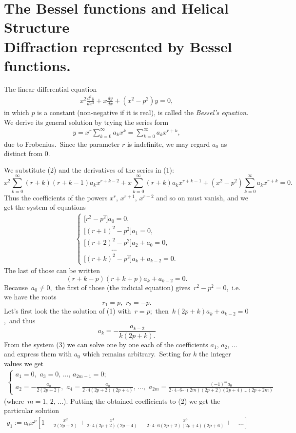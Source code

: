 \documentclass[12pt]{article}
\theoremstyle{plain}
\theoremstyle{definition}
\numberwithin{equation}{section}
\begin{document}
 

\section{The Bessel functions and Helical Structure \\
Diffraction represented by Bessel functions.}

The linear differential equation 
\begin{align}
  x^2\frac{d^2y}{dx^2}+x\frac{dy}{dx}+(x^2-p^2)y = 0,
\end{align}
in which $p$ is a constant (non-negative if it is real), is called the {\em Bessel's equation}.\, We derive its general solution by trying the series form
\begin{align}
               y = x^r\sum_{k=0}^\infty a_kx^k = \sum_{k=0}^\infty a_kx^{r+k},
\end{align}
due to Frobenius.\, Since the parameter $r$ is indefinite, we may regard $a_0$ as distinct from 0.

We substitute (2) and the derivatives of the series in (1):
$$
x^2\sum_{k=0}^\infty(r+k)(r+k-1)a_kx^{r+k-2}+
  x\sum_{k=0}^\infty(r+k)a_kx^{r+k-1}+
(x^2-p^2)\sum_{k=0}^\infty a_kx^{r+k} = 0.
$$
Thus the coefficients of the powers $x^r$, $x^{r+1}$, $x^{r+2}$ and so on must vanish, and we get the system of equations
\begin{align}
\begin{cases}
{[}r^2-p^2{]}a_0 = 0,\\
{[}(r+1)^2-p^2{]}a_1 = 0,\\
{[}(r+2)^2-p^2{]}a_2+a_0 = 0,\\
\qquad \qquad \ldots\\
{[}(r+k)^2-p^2{]}a_k+a_{k-2} = 0.
\end{cases}
\end{align}
The last of those can be written
$$(r+k-p)(r+k+p)a_k+a_{k-2} = 0.$$
Because\, $a_0 \neq 0$,\, the first of those (the indicial equation) gives\, $r^2-p^2 = 0$,\, i.e. we have the roots
$$r_1 =  p,\,\, r_2 = -p.$$
Let's first look the the solution of (1) with\, $r = p$;\, then\, $k(2p+k)a_k+a_{k-2} = 0$,\, and thus\,
$$a_k = -\frac{a_{k-2}}{k(2p+k).}$$
From the system (3) we can solve one by one each of the coefficients $a_1$, $a_2$, $\ldots$\, and express them with $a_0$ which remains arbitrary.\, Setting for $k$ the integer values we get
\begin{align}
\begin{cases}
a_1 = 0,\,\,a_3 = 0,\,\ldots,\, a_{2m-1} = 0;\\
a_2 = -\frac{a_0}{2(2p+2)},\,\,a_4 = \frac{a_0}{2\cdot4(2p+2)(2p+4)},\,\ldots,\,\,
a_{2m} = \frac{(-1)^ma_0}{2\cdot4\cdot6\cdots(2m)(2p+2)(2p+4)\ldots(2p+2m)}
\end{cases}
\end{align}
(where\, $m = 1,\,2,\,\ldots$).
Putting the obtained coefficients to (2) we get the particular solution 
\begin{align}
 y_1 := a_0x^p \left[1\!-\!\frac{x^2}{2(2p\!+\!2)}\!
+\!\frac{x^4}{2\!\cdot\!4(2p\!+\!2)(2p\!+\!4)}
\!-\!\frac{x^6}{2\!\cdot\!4\!\cdot\!6(2p\!+\!2)(2p\!+\!4)(2p\!+\!6)}\!+-\ldots\right]
\end{align}
\end{document}
